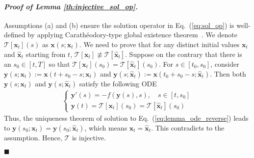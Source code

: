 \documentclass{article} \usepackage{iclr2024_coNFErence,times}
\def\eqref#1{equation~\ref{#1}}
\newenvironment{myproof}[2]{\paragraph{\textit{Proof of {#1} {#2}. }}}{\hfill$\blacksquare$}
\def\eqref#1{(\ref{#1})}
\def\eqref#1{(\ref{#1})}
\theoremstyle{definition}
\theoremstyle{remark}
\begin{document}
\begin{myproof}{Lemma}{\ref{th:injective_sol_op}}

    Assumptions (a) and (b) ensure the solution operator in Eq.~\eqref{eq:sol_op} is well-defined by applying Carath\'eodory-type global existence theorem~\citep{reid1971ordinary}. We denote $\mathcal{T}[\mathbf{x}_t](s)$ as $\mathbf{x}(s; \mathbf{x}_t)$.
    We need to prove that for any distinct initial values $\mathbf{x}_t$ and $\hat{\mathbf{x}}_t$ starting from $t$,  $\mathcal{T}[\mathbf{x}_t]\not\equiv \mathcal{T}[\hat{\mathbf{x}}_t]$. Suppose on the contrary that there is an $s_0\in[t, T]$ so that $\mathcal{T}[\mathbf{x}_t](s_0) = \mathcal{T}[\hat{\mathbf{x}}_t](s_0)$. For $s\in[t_0,s_0]$, consider 
    $\mathbf{y}(s; \mathbf{x}_t) :=\mathbf{x}(t + s_0-s; \mathbf{x}_t)$ and $\mathbf{y}(s; \hat{\mathbf{x}}_t) :=\mathbf{x}(t_0 + s_0-s; \hat{\mathbf{x}}_t)$.
    Then both $\mathbf{y}(s; \mathbf{x}_t)$ and $\mathbf{y}(s; \hat{\mathbf{x}}_t)$ satisfy the following ODE
    \begin{align}\label{eq:lemma_ode_reverse}
    \begin{cases}
        \mathbf{y}'(s)=-f(\mathbf{y}(s), s), \quad s\in[t,s_0]\\
        \mathbf{y}(t)=\mathcal{T}[\mathbf{x}_t](s_0) = \mathcal{T}[\hat{\mathbf{x}}_t](s_0) 
    \end{cases}
    \end{align}
    Thus, the uniqueness theorem of solution to Eq.~\eqref{eq:lemma_ode_reverse} leads to $\mathbf{y}(s_0; \mathbf{x}_t) = \mathbf{y}(s_0; \hat{\mathbf{x}}_t)$, which means $\mathbf{x}_t=\hat{\mathbf{x}}_t$. This contradicts to the assumption. Hence, $\mathcal{T}$ is injective. 


\end{myproof}
\end{document}
